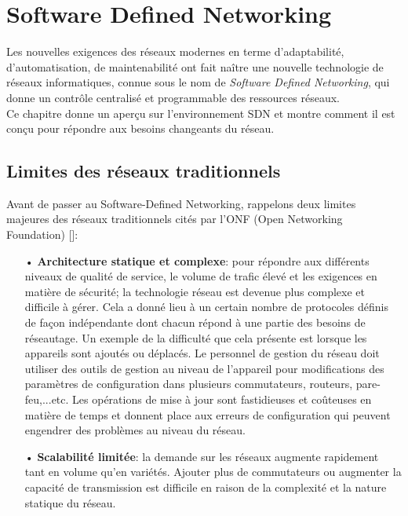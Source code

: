 \mainmatter
\chapter{Software Defined Networking} 

\label{Chapter1} 

Les nouvelles exigences des réseaux modernes en terme d’adaptabilité, d’automatisation, de maintenabilité ont fait naître une nouvelle technologie de réseaux informatiques, connue sous le nom de \textit{Software Defined Networking}, qui donne un contrôle centralisé et programmable des ressources réseaux.\\
Ce chapitre donne un aperçu sur l’environnement SDN et montre comment il est conçu  pour répondre aux besoins changeants du réseau.

\section{Limites des réseaux traditionnels}
Avant de passer au Software-Defined Networking, rappelons deux limites majeures des réseaux traditionnels cités par l'ONF (Open Networking Foundation) [\cite{1}]:\\
\begin{itemize}
\item[•] \textbf{Architecture statique et complexe}: pour répondre aux différents niveaux de qualité de service, le volume de trafic élevé et les exigences en matière de sécurité; la technologie réseau est devenue plus complexe et difficile à gérer. Cela a donné lieu à un certain nombre de protocoles définis de façon indépendante dont chacun répond à une partie des besoins de réseautage. Un exemple de la difficulté que cela présente est lorsque les appareils sont ajoutés ou déplacés. Le personnel de gestion du réseau doit utiliser des outils de gestion au niveau de l’appareil pour modifications des paramètres de configuration dans plusieurs commutateurs, routeurs, pare-feu,...etc. Les opérations de mise à jour sont fastidieuses et coûteuses en matière de temps et donnent place aux erreurs de configuration qui peuvent engendrer des problèmes au niveau du réseau.\\
\item[•] \textbf{Scalabilité limitée}: la demande sur les réseaux augmente rapidement tant en volume qu’en variétés. Ajouter plus de commutateurs ou augmenter la capacité de transmission est difficile en raison de la complexité et la nature statique du réseau.
\end{itemize}

